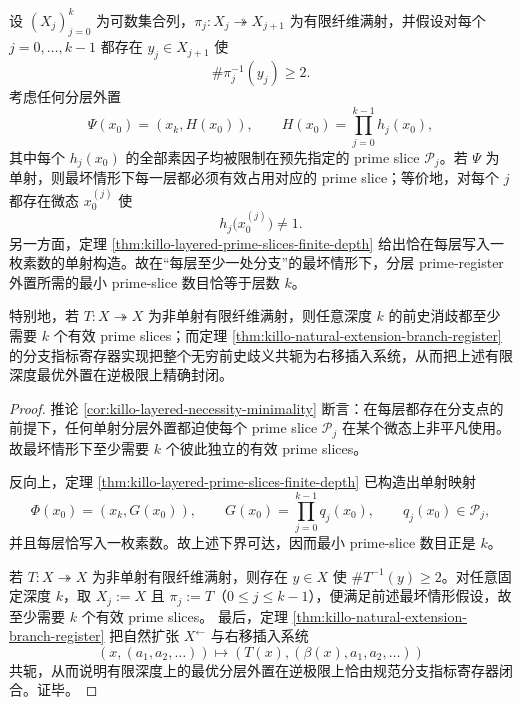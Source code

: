 \begin{theorem}\label{thm:xi-layered-prime-register-sharp-natural-extension}
设 \((X_j)_{j=0}^{k}\) 为可数集合列，\(\pi_j:X_j\twoheadrightarrow X_{j+1}\) 为有限纤维满射，并假设对每个 \(j=0,\dots,k-1\) 都存在 \(y_j\in X_{j+1}\) 使
\[
\#\pi_j^{-1}(y_j)\ge 2.
\]
考虑任何分层外置
\[
\Psi(x_0)=(x_k,H(x_0)),
\qquad
H(x_0)=\prod_{j=0}^{k-1}h_j(x_0),
\]
其中每个 \(h_j(x_0)\) 的全部素因子均被限制在预先指定的 prime slice \(\mathcal P_j\)。若 \(\Psi\) 为单射，则最坏情形下每一层都必须有效占用对应的 prime slice；等价地，对每个 \(j\) 都存在微态 \(x_0^{(j)}\) 使
\[
h_j\bigl(x_0^{(j)}\bigr)\neq 1.
\]
另一方面，定理 \ref{thm:killo-layered-prime-slices-finite-depth} 给出恰在每层写入一枚素数的单射构造。故在“每层至少一处分支”的最坏情形下，分层 prime-register 外置所需的最小 prime-slice 数目恰等于层数 \(k\)。

特别地，若 \(T:X\twoheadrightarrow X\) 为非单射有限纤维满射，则任意深度 \(k\) 的前史消歧都至少需要 \(k\) 个有效 prime slices；而定理 \ref{thm:killo-natural-extension-branch-register} 的分支指标寄存器实现把整个无穷前史歧义共轭为右移插入系统，从而把上述有限深度最优外置在逆极限上精确封闭。
\end{theorem}
\begin{proof}
推论 \ref{cor:killo-layered-necessity-minimality} 断言：在每层都存在分支点的前提下，任何单射分层外置都迫使每个 prime slice \(\mathcal P_j\) 在某个微态上非平凡使用。故最坏情形下至少需要 \(k\) 个彼此独立的有效 prime slices。
\par
反向上，定理 \ref{thm:killo-layered-prime-slices-finite-depth} 已构造出单射映射
\[
\Phi(x_0)=(x_k,G(x_0)),
\qquad
G(x_0)=\prod_{j=0}^{k-1}q_j(x_0),
\qquad
q_j(x_0)\in\mathcal P_j,
\]
并且每层恰写入一枚素数。故上述下界可达，因而最小 prime-slice 数目正是 \(k\)。
\par
若 \(T:X\twoheadrightarrow X\) 为非单射有限纤维满射，则存在 \(y\in X\) 使 \(\#T^{-1}(y)\ge 2\)。对任意固定深度 \(k\)，取 \(X_j:=X\) 且 \(\pi_j:=T\)（\(0\le j\le k-1\)），便满足前述最坏情形假设，故至少需要 \(k\) 个有效 prime slices。
最后，定理 \ref{thm:killo-natural-extension-branch-register} 把自然扩张
\(
X^{\leftarrow}
\)
与右移插入系统
\[
(x,(a_1,a_2,\dots))\longmapsto (T(x),(\beta(x),a_1,a_2,\dots))
\]
共轭，从而说明有限深度上的最优分层外置在逆极限上恰由规范分支指标寄存器闭合。证毕。
\end{proof}





\endinput
